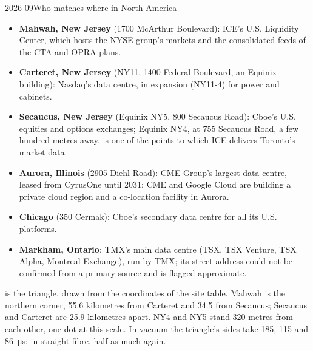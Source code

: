 \begin{dated}{2026-09}{Who matches where in North America}\label{dat:nw:the-north-american-map:sites}
\begin{itemize}
\item \textbf{Mahwah, New Jersey} (1700 McArthur Boulevard): ICE's U.S. Liquidity Center, which hosts the NYSE group's markets and the
  consolidated feeds of the CTA and OPRA plans.
\item \textbf{Carteret, New Jersey} (NY11, 1400 Federal Boulevard, an Equinix building): Nasdaq's data centre, in expansion (NY11-4) for
  power and cabinets.
\item \textbf{Secaucus, New Jersey} (Equinix NY5, 800 Secaucus Road): Cboe's U.S. equities and options exchanges; Equinix NY4, at 755
  Secaucus Road, a few hundred metres away, is one of the points to which ICE delivers Toronto's market data.
\item \textbf{Aurora, Illinois} (2905 Diehl Road): CME Group's largest data centre, leased from CyrusOne until 2031; CME and Google Cloud
  are building a private cloud region and a co-location facility in Aurora.
\item \textbf{Chicago} (350 Cermak): Cboe's secondary data centre for all its U.S. platforms.
\item \textbf{Markham, Ontario}: TMX's main data centre (TSX, TSX Venture, TSX Alpha, Montreal Exchange), run by TMX; its street address
  could not be confirmed from a primary source and is flagged approximate.
\end{itemize}
\end{dated}

 is the triangle, drawn from the coordinates of the site table. Mahwah is the northern corner, 55.6
kilometres from Carteret and 34.5 from Secaucus; Secaucus and Carteret are 25.9 kilometres apart. NY4 and NY5 stand 320 metres from each
other, one dot at this scale. In vacuum the triangle's sides take 185, 115 and \qty{86}{\micro\second}; in straight fibre, half as much again.

